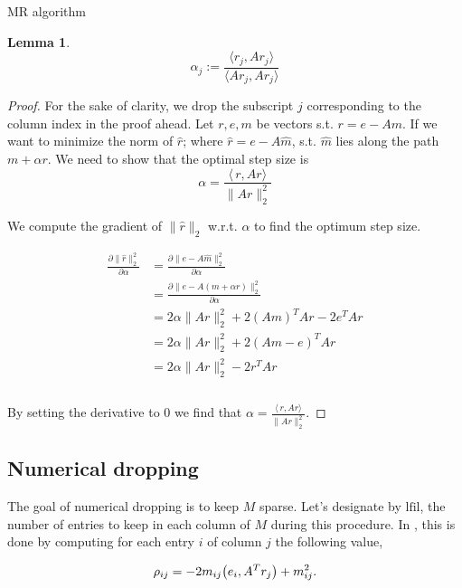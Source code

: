 \documentclass[paper=A4, fontsize=11pt]{scrartcl}
\let\originalleft\left
\let\originalright\right
\renewcommand{\left}{\mathopen{}\mathclose\bgroup\originalleft}
\renewcommand{\right}{\aftergroup\egroup\originalright}
\newtheorem{lemma}{Lemma}[section]
\theoremstyle{remark}
\begin{document}
\begin{section}{MR algorithm}
\begin{lemma}
	\begin{equation}
	\alpha_{j} :=\frac{\langle r_{j}, A r_{j}\rangle}{\langle A r_{j}, A r_{j}\rangle}
	\end{equation}
	
\end{lemma}

\begin{proof}
		For the sake of clarity, we drop the subscript $j$ corresponding to the column index in the proof ahead. 
		Let $r, e, m$ be vectors s.t. $r = e - Am$. If we want to minimize the norm of $\hat{r}$; where $\hat{r} = e - A\hat{m}$, s.t. $\hat{m}$ lies along the path $m + \alpha r$. We need to show that the optimal step size is $$\alpha = \frac{\langle\,r,Ar\rangle}{\|Ar\|_{2}^{2}}$$
	
		We compute the gradient of $\|\hat{r}\|_{2}$ w.r.t. $\alpha$ to find the optimum step size. 
	
	\begin{equation}
	\begin{aligned}
	\frac{\partial \|\hat{r} \|_{2}^{2}}{\partial \alpha} 
	& = \frac{\partial \|e - A\hat{m}\|_{2}^{2}}{\partial \alpha} \\
	& = \frac{\partial \|e - A(m + \alpha r)\|_{2}^{2}}{\partial \alpha} \\
	& = 2\alpha \|Ar\|_{2}^{2}  + 2(Am)^{T}Ar - 2e^{T}Ar \\
	& = 2\alpha \|Ar\|_{2}^{2}  + 2(Am - e)^{T}Ar \\
	& = 2\alpha \|Ar\|_{2}^{2}  - 2r^{T}Ar \\
	\\
	\end{aligned}
	\end{equation}
	
	By setting the derivative to $0$ we find that $\alpha = \frac{\langle\,r,Ar\rangle}{\|Ar\|_{2}^{2}}$.
\end{proof}	

	
	
	\subsection{Numerical dropping}
	The goal of numerical dropping is to keep $M$ sparse. Let's designate by $\text{lfil}$, the number of entries to keep in each column of $M$ during this procedure. In \cite{chow}, this is done by computing for each entry $i$ of column $j$ the following value, 
	

	\begin{equation}\label{eq:rho}
	\rho_{i j}=-2 m_{i j}\left(e_{i}, A^{T} r_{j}\right)+m_{i j}^{2}.
	\end{equation}


\end{section}
\end{document}

